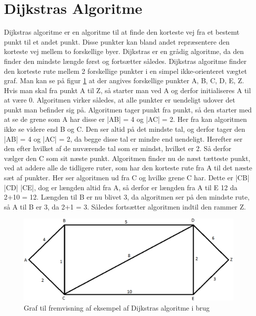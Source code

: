 \section{Dijkstras Algoritme}

Dijkstras algoritme er en algoritme til at finde den korteste vej fra et bestemt punkt til et andet punkt. Disse punkter kan bland andet repræsentere den korteste vej mellem to forskellige byer. Dijkstras er en grådig algoritme, da den finder den mindste længde først og fortsætter således.\cite{DMATBOGEN}
Dijkstras algoritme finder den korteste rute mellem 2 forskellige punkter i en simpel ikke-orienteret vægtet graf. Man kan se på figur \ref{fig:dijkstrasgraf} at der angives forskellige punkter {A, B, C, D, E, Z}. Hvis man skal fra punkt A til Z, så starter man ved A og derfor initialiseres A til at være 0. Algoritmen virker således, at alle punkter er uendeligt udover det punkt man befinder sig på. Algoritmen tager punkt fra punkt, så den starter med at se de grene som A har disse er |AB| = 4 og |AC| = 2. Her fra kan algoritmen ikke se videre end B og C. Den ser altid på det mindste tal, og derfor tager den |AB| = 4 og |AC| = 2, da begge disse tal er mindre end uendeligt. Herefter ser den efter hvilket af de nuværende tal som er mindst, hvilket er 2. Så derfor vælger den C som sit næste punkt. Algoritmen finder nu de næst tætteste punkt, ved at addere alle de tidligere ruter, som har den korteste rute fra A til det næste sæt af punkter. Her ser algoritmen ud fra C og hvilke grene C har. Dette er |CB| |CD| |CE|, dog er længden altid fra A, så derfor er længden fra A til E 12 da 2+10 = 12. Længden til B er nu blivet 3, da algoritmen ser på den mindste rute, så A til B er 3, da 2+1 = 3. Således fortsætter algoritmen indtil den rammer Z.\cite{DMATBOGEN}

\begin{figure}[ht!]
\begin{adjustbox}{width=1.2\textwidth,center=\textwidth}
\centering
\includegraphics[width=1.2\textwidth]{Pictures/Teoriafsnit/Figurfiler/dijkstrasgraf.png}
\end{adjustbox}
\label{fig:dijkstrasgraf}
\caption{Graf til fremvisning af eksempel af Dijkstras algoritme i brug}
\end{figure}

